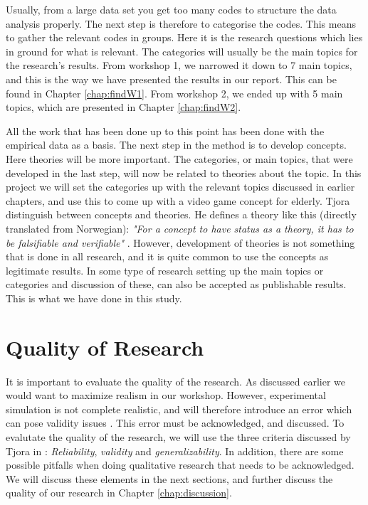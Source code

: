 Usually, from a large data set you get too many codes to structure the data analysis properly. The next step is therefore to categorise the codes. This means to gather the relevant codes in groups. Here it is the research questions which lies in ground for what is relevant. The categories will usually be the main topics for the research's results. From workshop 1, we narrowed it down to 7 main topics, and this is the way we have presented the results in our report. This can be found in Chapter \ref{chap:findW1}. From workshop 2, we ended up with 5 main topics, which are presented in Chapter \ref{chap:findW2}.

All the work that has been done up to this point has been done with the empirical data as a basis. The next step in the method is to develop concepts. Here theories will be more important. The categories, or main topics, that were developed in the last step, will now be related to theories about the topic. In this project we will set the categories up with the relevant topics discussed in earlier chapters, and use this to come up with a video game concept for elderly. Tjora \cite{tjora} distinguish between concepts and theories. He defines a theory like this (directly translated from Norwegian): \emph{"For a concept to have status as a theory, it has to be falsifiable and verifiable"} \cite{tjora}. However, development of theories is not something that is done in all research, and it is quite common to use the concepts as legitimate results. In some type of research setting up the main topics or categories and discussion of these, can also be accepted as publishable results. This is what we have done in this study. 

\section{Quality of Research}
\label{sec:qualityresearch}
It is important to evaluate the quality of the research. As discussed earlier we would want to maximize realism in our workshop. However, experimental simulation is not complete realistic, and will therefore introduce an error which can pose validity issues \cite{alsos}.  This error must be acknowledged, and discussed. To evalutate the quality of the research, we will use the three criteria discussed by Tjora in \cite{tjora}:  \emph{Reliability}, \emph{validity} and \emph{generalizability}. In addition, there are some possible pitfalls when doing qualitative research that needs to be acknowledged. We will discuss these elements in the next sections, and further discuss the quality of our research in Chapter \ref{chap:discussion}.  

